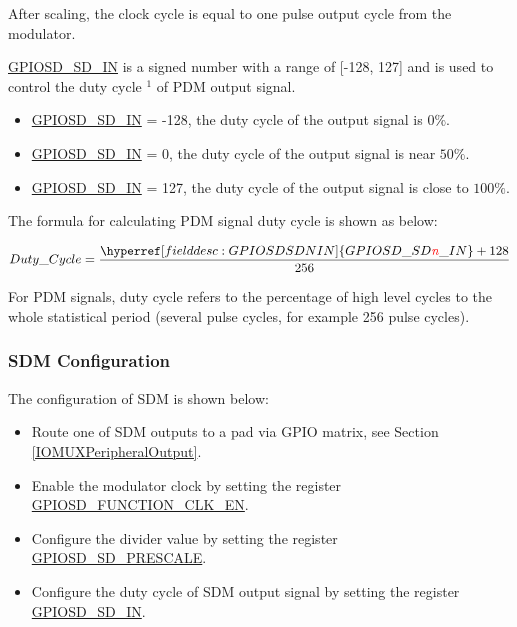 \documentclass[main\_\_EN.tex]{subfiles}
\begin{document}
After scaling, the clock cycle is equal to one pulse output cycle from the modulator.

\hyperref[fielddesc:GPIOSDSDNIN]{GPIOSD\_SD\_IN} is a signed number with a range of [-128, 127] and is used to control the duty cycle $^{1}$ of PDM output signal.

\begin{itemize}
    \item \hyperref[fielddesc:GPIOSDSDNIN]{GPIOSD\_SD\_IN} = -128, the duty cycle of the output signal is \begin{math}0\% \end{math}.
    \item \hyperref[fielddesc:GPIOSDSDNIN]{GPIOSD\_SD\_IN} = 0, the duty cycle of the output signal is near \begin{math}50\% \end{math}.
    \item \hyperref[fielddesc:GPIOSDSDNIN]{GPIOSD\_SD\_IN} = 127, the duty cycle of the output signal is close to  \begin{math}100\% \end{math}.
\end{itemize}

The formula for calculating PDM signal duty cycle is shown as below:

    \[
    Duty\_Cycle=\frac{\hyperref[fielddesc:GPIOSDSDNIN]{GPIOSD\_SD\regindex{n}\_IN} + 128} {256}
    \]

\begin{tiplisting}
For PDM signals, duty cycle refers to the percentage of high level cycles to the whole statistical period (several pulse cycles, for example 256 pulse cycles).

\end{tiplisting}


\subsubsection{SDM Configuration}

The configuration of SDM is shown below:

\begin{itemize}
    \item Route one of SDM outputs to a pad via GPIO matrix, see Section \ref{IOMUXPeripheralOutput}.
    \item Enable the modulator clock by setting the register \hyperref[fielddesc:GPIOSDFUNCTIONCLKEN]{GPIOSD\_FUNCTION\_CLK\_EN}.
    \item Configure the divider value by setting the register \hyperref[fielddesc:GPIOSDSDNPRESCALE]{GPIOSD\_SD\_PRESCALE}.
    \item Configure the duty cycle of SDM output signal by setting the register \hyperref[fielddesc:GPIOSDSDNIN]{GPIOSD\_SD\_IN}.
\end{itemize}
\end{document}
